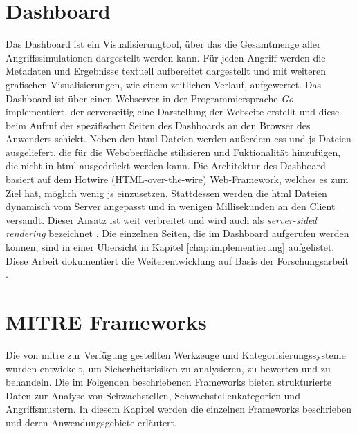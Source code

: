 \section{Dashboard}
\label{sec:tech-dashboard}
Das Dashboard ist ein Visualisierungtool, über das die Gesamtmenge aller Angriffssimulationen dargestellt werden kann. Für jeden Angriff werden die Metadaten und Ergebnisse textuell aufbereitet dargestellt und mit weiteren grafischen Visualisierungen, wie einem zeitlichen Verlauf, aufgewertet.
Das Dashboard ist über einen Webserver in der Programmiersprache \textit{Go} implementiert, der serverseitig eine Darstellung der Webseite erstellt und diese beim Aufruf der spezifischen Seiten des Dashboards an den Browser des Anwenders schickt. Neben den \gls{html} Dateien werden außerdem \gls{css} und \gls{js} Dateien ausgeliefert, die für die Weboberfläche stilisieren und Fuktionalität hinzufügen, die nicht in \gls{html} ausgedrückt werden kann. Die Architektur des Dashboard basiert auf dem Hotwire (HTML-over-the-wire) Web-Framework, welches es zum Ziel hat, möglich wenig \gls{js} einzusetzen. Stattdessen werden die \gls{html} Dateien dynamisch vom Server angepasst und in wenigen Millisekunden an den Client versandt. Dieser Ansatz ist weit verbreitet und wird auch als \textit{server-sided rendering} bezeichnet \autocite{HTMLWireHotwire}. Die einzelnen Seiten, die im Dashboard aufgerufen werden können, sind in einer Übersicht in Kapitel \ref{chap:implementierung} aufgelistet.
Diese Arbeit dokumentiert die Weiterentwicklung auf Basis der Forschungsarbeit \autocite{weberEvaluationDashboardTechniques}.

\label{bg:mitre-frameworks}
\section{MITRE Frameworks}
Die von \gls{mitre} zur Verfügung gestellten Werkzeuge und Kategorisierungssysteme wurden entwickelt, um Sicherheitsrisiken zu analysieren, zu bewerten und zu behandeln. Die im Folgenden beschriebenen Frameworks bieten strukturierte Daten zur Analyse von Schwachstellen, Schwachstellenkategorien und Angriffsmustern. In diesem Kapitel werden die einzelnen Frameworks beschrieben und deren Anwendungsgebiete erläutert.

